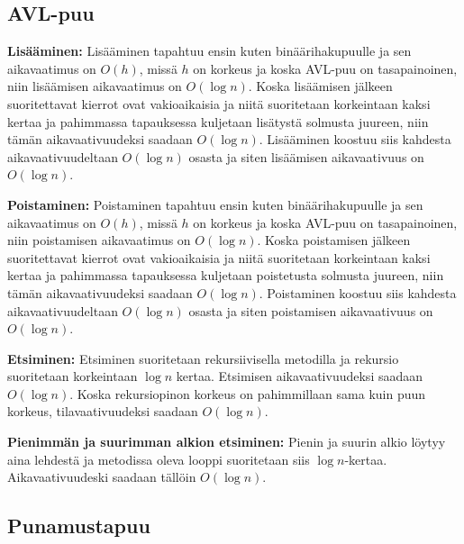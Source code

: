 \documentclass[12pt,a4paper,leqno,titlepage,twoside]{article}
\begin{document}
\subsection*{AVL-puu}

\begin{description}
\item{\textbf{Lisääminen:}} Lisääminen tapahtuu ensin kuten binäärihakupuulle
ja sen aikavaatimus on $O(h)$, missä $h$ on korkeus ja koska AVL-puu on tasapainoinen,
niin lisäämisen aikavaatimus on $O(\log n)$. Koska lisäämisen jälkeen suoritettavat
kierrot ovat vakioaikaisia ja niitä suoritetaan korkeintaan kaksi kertaa ja pahimmassa
tapauksessa kuljetaan lisätystä solmusta juureen, niin tämän aikavaativuudeksi
saadaan $O(\log n)$. Lisääminen koostuu siis kahdesta aikavaativuudeltaan $O(\log n)$
osasta ja siten lisäämisen aikavaativuus on $O(\log n)$.

\item{\textbf{Poistaminen:}} Poistaminen tapahtuu ensin kuten binäärihakupuulle
ja sen aikavaatimus on $O(h)$, missä $h$ on korkeus ja koska AVL-puu on tasapainoinen,
niin poistamisen aikavaatimus on $O(\log n)$. Koska poistamisen jälkeen suoritettavat
kierrot ovat vakioaikaisia ja niitä suoritetaan korkeintaan kaksi kertaa ja pahimmassa
tapauksessa kuljetaan poistetusta solmusta juureen, niin tämän aikavaativuudeksi
saadaan $O(\log n)$. Poistaminen koostuu siis kahdesta aikavaativuudeltaan $O(\log n)$
osasta ja siten poistamisen aikavaativuus on $O(\log n)$.

\item{\textbf{Etsiminen:}} Etsiminen suoritetaan rekursiivisella metodilla ja
rekursio suoritetaan korkeintaan $\log n$ kertaa. Etsimisen aikavaativuudeksi
saadaan $O(\log n)$. Koska rekursiopinon korkeus on pahimmillaan sama kuin puun
korkeus, tilavaativuudeksi saadaan $O(\log n)$.

\item{\textbf{Pienimmän ja suurimman alkion etsiminen:}} Pienin ja suurin alkio
löytyy aina lehdestä ja metodissa oleva looppi suoritetaan siis $\log n$-kertaa.
Aikavaativuudeski saadaan tällöin $O(\log n)$.
\end{description}

\subsection*{Punamustapuu}
\end{document}
